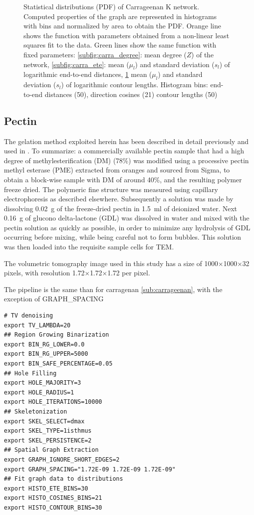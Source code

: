 \begin{figure}[H]
\begin{subfigure}{0.5\textwidth}
    \label{subfig:carra_contour}
  \end{subfigure}
  \caption{Statistical distributions (PDF) of Carrageenan K network. Computed properties of the graph are represented in histograms with bins and normalized by area to obtain the PDF. Orange line shows the function with parameters obtained from a non-linear least squares fit to the data.
    Green lines show the same function with fixed parameters: \ref{subfig:carra_degree}: mean degree ($Z$) of the network, \ref{subfig:carra_ete}: mean ($\mu_l$) and standard deviation ($s_l$) of logarithmic end-to-end distances,
  \ref{subfig:carra_contour} mean ($\mu_l$) and standard deviation ($s_l$) of logarithmic contour lengths.
Histogram bins: end-to-end distances (50), direction cosines (21) contour lengths (50) }
  \label{fig:carra_thin}
\end{figure}

\subsection{Pectin}%
\label{sub:Pectin}

The gelation method exploited herein has been described in detail previously \cite{mansel_zooming_2015} and used in \cite{hernandez-cerdan_structural_2018-2}.
To summarize: a commercially available pectin sample that had a high degree of methylesterification (DM) (78\%) was modified using a processive pectin methyl esterase (PME) extracted from oranges and sourced from Sigma, to obtain a block-wise sample with DM of around 40\%, and the resulting polymer freeze dried. The polymeric fine structure was measured using capillary electrophoresis as described elsewhere. Subsequently a solution was made by dissolving \SI{0.02}{\g} of the freeze-dried pectin in \SI{1.5}{\ml} of deionized water. Next \SI{0.16}{\g} of glucono delta-lactone (GDL) was dissolved in water and mixed with the pectin solution as quickly as possible, in order to minimize any hydrolysis of GDL occurring before mixing, while being careful not to form bubbles. This solution was then loaded into the requisite sample cells for \gls{TEM}.

The volumetric tomography image used in this study has a size of 1000$\times$1000$\times$32 pixels, with resolution 1.72$\times$1.72$\times$1.72 \nm per pixel.

The pipeline is the same than for carragenan \autoref{sub:carrageenan}, with the exception of GRAPH\_SPACING
\begin{verbatim}
# TV denoising
export TV_LAMBDA=20
## Region Growing Binarization
export BIN_RG_LOWER=0.0
export BIN_RG_UPPER=5000
export BIN_SAFE_PERCENTAGE=0.05
## Hole Filling
export HOLE_MAJORITY=3
export HOLE_RADIUS=1
export HOLE_ITERATIONS=10000
## Skeletonization
export SKEL_SELECT=dmax
export SKEL_TYPE=1isthmus
export SKEL_PERSISTENCE=2
## Spatial Graph Extraction
export GRAPH_IGNORE_SHORT_EDGES=2
export GRAPH_SPACING="1.72E-09 1.72E-09 1.72E-09"
## Fit graph data to distributions
export HISTO_ETE_BINS=30
export HISTO_COSINES_BINS=21
export HISTO_CONTOUR_BINS=30
\end{verbatim}

